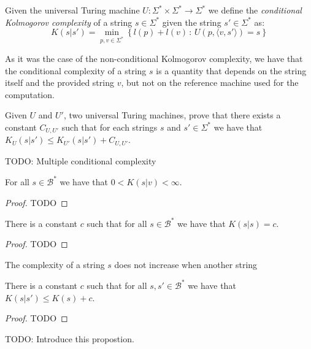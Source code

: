 \begin{definition}
Given the universal Turing machine $U:\Sigma^{\ast}\times\Sigma^{\ast}\rightarrow\Sigma^{\ast}$ we define the \emph{conditional Kolmogorov complexity} of a string $s\in\Sigma^{\ast}$ given the string $s'\in\Sigma^{\ast}$ as:
\[
K(s|s')=\min_{p,v\in\Sigma^{\ast}}\left\{l(p) + l(v)\,:\, U(p,\langle v, s' \rangle)=s\right\}
\]
\end{definition}

As it was the case of the non-conditional Kolmogorov complexity, we have that the conditional complexity of a string $s$ is a quantity that depends on the string itself and the provided string $v$, but not on the reference machine used for the computation.

\begin{exercise}
Given $U$ and $U'$, two universal Turing machines, prove that there exists a constant $C_{U, U'}$ such that for each strings $s$ and $s' \in \Sigma^{\ast}$ we have that $K_{U}(s|s') \leq K_{U'}(s|s') + C_{U, U'}$.
\end{exercise}

{\color{red} TODO: Multiple conditional complexity}

\begin{proposition}
For all $s\in\mathcal{B}^{\ast}$ we have that $0 < K(s | v) < \infty$.
\end{proposition}
\begin{proof}
{\color{red} TODO}
\end{proof}


\begin{proposition}
There is a constant $c$ such that for all $s\in\mathcal{B}^{\ast}$ we have that $K(s | s ) = c$.
\end{proposition}
\label{prop:self_conditional}
\begin{proof}
{\color{red} TODO}
\end{proof}

The complexity of a string $s$ does not increase when another string

\begin{proposition}
\label{prop:kolmogorov_conditional}
There is a constant $c$ such that for all $s, s'\in\mathcal{B}^{\ast}$ we have that $K(s | s' ) \leq K(s) + c$.
\end{proposition}
\begin{proof}
{\color{red} TODO}
\end{proof}

{\color{red} TODO: Introduce this propostion.}

